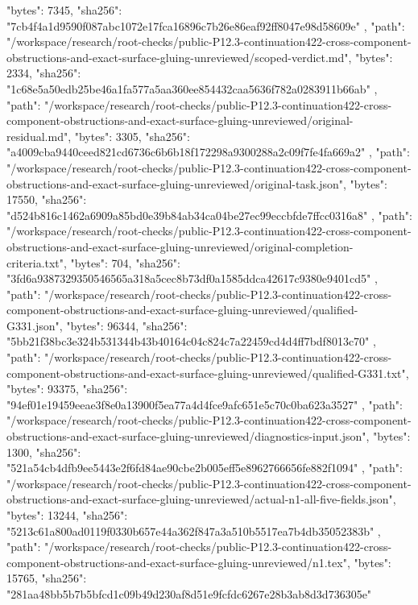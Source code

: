 \documentclass[11pt]{article}
\begin{document}
\begin{Full422Data}
{{      "bytes": 7345,
      "sha256": "7cb4f4a1d9590f087abc1072e17fca16896c7b26e86eaf92ff8047e98d58609e"
    },
    {
      "path": "/workspace/research/root-checks/public-P12.3-continuation422-cross-component-obstructions-and-exact-surface-gluing-unreviewed/scoped-verdict.md",
      "bytes": 2334,
      "sha256": "1c68e5a50edb25be46a1fa577a5aa360ee854432caa5636f782a0283911b66ab"
    },
    {
      "path": "/workspace/research/root-checks/public-P12.3-continuation422-cross-component-obstructions-and-exact-surface-gluing-unreviewed/original-residual.md",
      "bytes": 3305,
      "sha256": "a4009cba9440ceed821cd6736c6b6b18f172298a9300288a2c09f7fe4fa669a2"
    },
    {
      "path": "/workspace/research/root-checks/public-P12.3-continuation422-cross-component-obstructions-and-exact-surface-gluing-unreviewed/original-task.json",
      "bytes": 17550,
      "sha256": "d524b816c1462a6909a85bd0e39b84ab34ca04be27ec99eccbfde7ffcc0316a8"
    },
    {
      "path": "/workspace/research/root-checks/public-P12.3-continuation422-cross-component-obstructions-and-exact-surface-gluing-unreviewed/original-completion-criteria.txt",
      "bytes": 704,
      "sha256": "3fd6a9387329350546565a318a5cec8b73df0a1585ddca42617c9380e9401cd5"
    },
    {
      "path": "/workspace/research/root-checks/public-P12.3-continuation422-cross-component-obstructions-and-exact-surface-gluing-unreviewed/qualified-G331.json",
      "bytes": 96344,
      "sha256": "5bb21f38bc3e324b531344b43b40164c04c824c7a22459cd4d4ff7bdf8013c70"
    },
    {
      "path": "/workspace/research/root-checks/public-P12.3-continuation422-cross-component-obstructions-and-exact-surface-gluing-unreviewed/qualified-G331.txt",
      "bytes": 93375,
      "sha256": "94ef01e19459eeae3f8e0a13900f5ea77a4d4fce9afc651e5c70c0ba623a3527"
    },
    {
      "path": "/workspace/research/root-checks/public-P12.3-continuation422-cross-component-obstructions-and-exact-surface-gluing-unreviewed/diagnostics-input.json",
      "bytes": 1300,
      "sha256": "521a54cb4dfb9ee5443e2f6fd84ae90cbe2b005eff5e8962766656fe882f1094"
    },
    {
      "path": "/workspace/research/root-checks/public-P12.3-continuation422-cross-component-obstructions-and-exact-surface-gluing-unreviewed/actual-n1-all-five-fields.json",
      "bytes": 13244,
      "sha256": "5213c61a800ad0119f0330b657e44a362f847a3a510b5517ea7b4db35052383b"
    },
    {
      "path": "/workspace/research/root-checks/public-P12.3-continuation422-cross-component-obstructions-and-exact-surface-gluing-unreviewed/n1.tex",
      "bytes": 15765,
      "sha256": "281aa48bb5b7b5bfcd1c09b49d230af8d51e9fcfdc6267e28b3ab8d3d736305e"
}}
\end{Full422Data}
\end{document}

